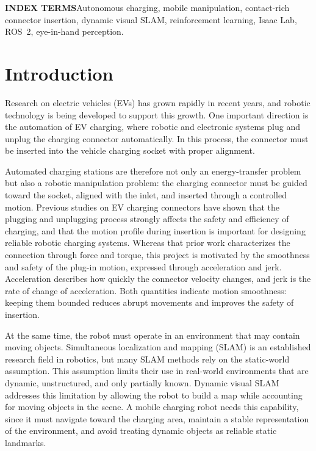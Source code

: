 \documentclass[10pt]{article}
\begin{document}
\noindent \textcolor{accessblue}{\bfseries INDEX TERMS}\quad Autonomous charging, mobile manipulation, contact-rich connector insertion, dynamic visual SLAM, reinforcement learning, Isaac Lab, ROS~2, eye-in-hand perception.\vspace{0.85em}

\tableofcontents
\clearpage
\listoffigures
\clearpage
\listoftables
\clearpage
\section{Introduction}

Research on electric vehicles (EVs) has grown rapidly in recent years, and robotic technology is being developed to support this growth. One important direction is the automation of EV charging, where robotic and electronic systems plug and unplug the charging connector automatically. In this process, the connector must be inserted into the vehicle charging socket with proper alignment.

Automated charging stations are therefore not only an energy-transfer problem but also a robotic manipulation problem: the charging connector must be guided toward the socket, aligned with the inlet, and inserted through a controlled motion. Previous studies on EV charging connectors have shown that the plugging and unplugging process strongly affects the safety and efficiency of charging, and that the motion profile during insertion is important for designing reliable robotic charging systems. Whereas that prior work characterizes the connection through force and torque, this project is motivated by the smoothness and safety of the plug-in motion, expressed through acceleration and jerk. Acceleration describes how quickly the connector velocity changes, and jerk is the rate of change of acceleration. Both quantities indicate motion smoothness: keeping them bounded reduces abrupt movements and improves the safety of insertion.

At the same time, the robot must operate in an environment that may contain moving objects. Simultaneous localization and mapping (SLAM) is an established research field in robotics, but many SLAM methods rely on the static-world assumption. This assumption limits their use in real-world environments that are dynamic, unstructured, and only partially known. Dynamic visual SLAM addresses this limitation by allowing the robot to build a map while accounting for moving objects in the scene. A mobile charging robot needs this capability, since it must navigate toward the charging area, maintain a stable representation of the environment, and avoid treating dynamic objects as reliable static landmarks.
\end{document}
